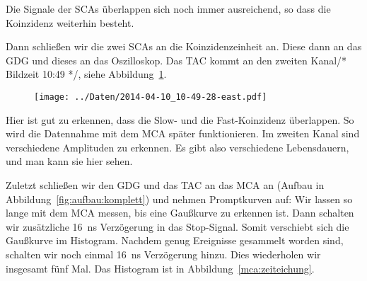 Die Signale der SCAs überlappen sich noch immer ausreichend, so dass die
Koinzidenz weiterhin besteht.

Dann schließen wir die zwei SCAs an die Koinzidenzeinheit an. Diese dann an das
GDG und dieses an das Oszilloskop. Das TAC kommt an den zweiten Kanal/*
Bildzeit 10:49 */, siehe Abbildung~\ref{fig:tac_oszi}.

\begin{figure}[htbp]
    \centering
    \texttt{[image: ../Daten/2014-04-10\_10-49-28-east.pdf]}
    \caption{%
    }
    \label{fig:tac_oszi}
\end{figure}

Hier ist gut zu erkennen, dass die Slow- und die Fast-Koinzidenz überlappen.
So wird die Datennahme mit dem MCA später funktionieren. Im zweiten Kanal sind
verschiedene Amplituden zu erkennen. Es gibt also verschiedene Lebensdauern,
und man kann sie hier sehen.

Zuletzt schließen wir den GDG und das TAC an das MCA an (Aufbau in
Abbildung~\ref{fig:aufbau:komplett}) und nehmen Promptkurven auf: Wir lassen
so lange mit dem MCA messen, bis eine Gaußkurve zu erkennen ist. Dann schalten
wir zusätzliche \SI{16}{\nano\second} Verzögerung in das Stop-Signal. Somit
verschiebt sich die Gaußkurve im Histogram. Nachdem genug Ereignisse gesammelt
worden sind, schalten wir noch einmal \SI{16}{\nano\second} Verzögerung hinzu.
Dies wiederholen wir insgesamt fünf Mal. Das Histogram ist in
Abbildung~\ref{mca:zeiteichung}.

